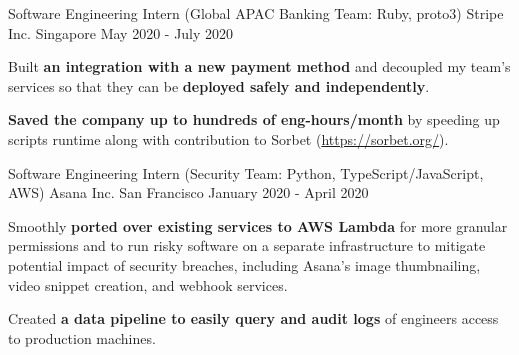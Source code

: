

\begin{cventries}


  \cventry
  {Software Engineering Intern (Global APAC Banking Team: Ruby, proto3)} %
  {Stripe Inc.} %
  {Singapore} %
  {May 2020 - July 2020} %
  {
    \begin{cvitems}
      \item {Built \textbf{an integration with a new payment method} and decoupled my team's services so that they can be \textbf{deployed safely and independently}.}
      \item {\textbf{Saved the company up to hundreds of eng-hours/month} by speeding up scripts runtime along with contribution to Sorbet (\url{https://sorbet.org/}).}
    \end{cvitems}
  }

  \cventry
  {Software Engineering Intern (Security Team: Python, TypeScript/JavaScript, AWS)} %
  {Asana Inc.} %
  {San Francisco} %
  {January 2020 - April 2020} %
  {
    \begin{cvitems}
      \item {Smoothly \textbf{ported over existing services to AWS Lambda} for more granular permissions and to run risky software on a separate infrastructure to mitigate potential impact of security breaches, including Asana's image thumbnailing, video snippet creation, and webhook services.}
      \item {Created \textbf{a data pipeline to easily query and audit logs} of engineers access to production machines.}
    \end{cvitems}
  }


\end{cventries}
